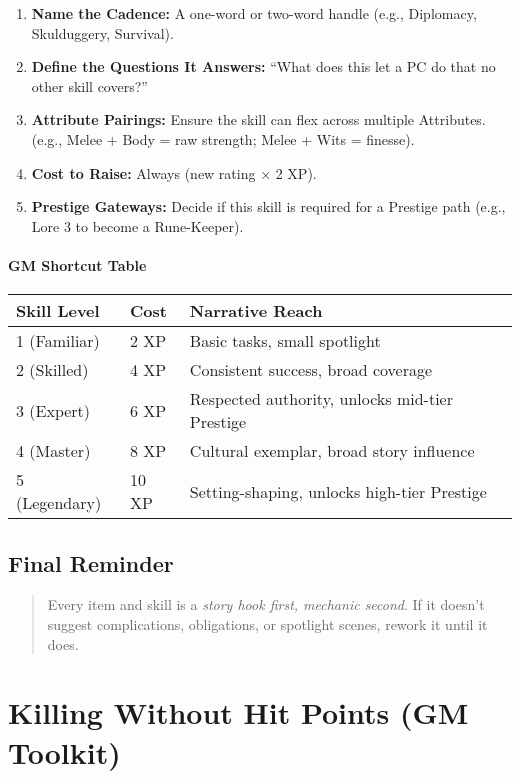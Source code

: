 \documentclass[12pt]{article}
\begin{document}
\begin{enumerate}
  \item \textbf{Name the Cadence:} A one-word or two-word handle (e.g., Diplomacy, Skulduggery, Survival).
  \item \textbf{Define the Questions It Answers:} “What does this let a PC do that no other skill covers?”
  \item \textbf{Attribute Pairings:} Ensure the skill can flex across multiple Attributes. (e.g., Melee + Body = raw strength; Melee + Wits = finesse).
  \item \textbf{Cost to Raise:} Always (new rating × 2 XP).
  \item \textbf{Prestige Gateways:} Decide if this skill is required for a Prestige path (e.g., Lore 3 to become a Rune-Keeper).
\end{enumerate}

\paragraph{GM Shortcut Table}
\begin{tabular}{@{}lll@{}}
\toprule
\textbf{Skill Level} & \textbf{Cost} & \textbf{Narrative Reach} \\
\midrule
1 (Familiar) & 2 XP & Basic tasks, small spotlight \\
2 (Skilled) & 4 XP & Consistent success, broad coverage \\
3 (Expert) & 6 XP & Respected authority, unlocks mid-tier Prestige \\
4 (Master) & 8 XP & Cultural exemplar, broad story influence \\
5 (Legendary) & 10 XP & Setting-shaping, unlocks high-tier Prestige \\
\bottomrule
\end{tabular}

\subsection*{Final Reminder}
\begin{quote}
Every item and skill is a \emph{story hook first, mechanic second}.  
If it doesn’t suggest complications, obligations, or spotlight scenes, rework it until it does.
\end{quote}

\section{Killing Without Hit Points (GM Toolkit)}
\end{document}
